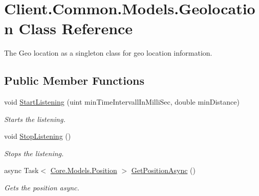 \hypertarget{classClient_1_1Common_1_1Models_1_1Geolocation}{}\section{Client.\+Common.\+Models.\+Geolocation Class Reference}
\label{classClient_1_1Common_1_1Models_1_1Geolocation}


The Geo location as a singleton class for geo location information.  


\subsection*{Public Member Functions}
\begin{DoxyCompactItemize}
\item 
void \hyperlink{classClient_1_1Common_1_1Models_1_1Geolocation_aed14d4e1cc101de935133d0fae3ef349}{Start\+Listening} (uint min\+Time\+Intervall\+In\+Milli\+Sec, double min\+Distance)
\begin{DoxyCompactList}\small\item\em Starts the listening. \end{DoxyCompactList}\item 
void \hyperlink{classClient_1_1Common_1_1Models_1_1Geolocation_a6b6da0803d978de553791129b51954e9}{Stop\+Listening} ()
\begin{DoxyCompactList}\small\item\em Stops the listening. \end{DoxyCompactList}\item 
async Task$<$ \hyperlink{classCore_1_1Models_1_1Position}{Core.\+Models.\+Position} $>$ \hyperlink{classClient_1_1Common_1_1Models_1_1Geolocation_abdc9ec177a896fdc87fa9850a104a79e}{Get\+Position\+Async} ()
\begin{DoxyCompactList}\small\item\em Gets the position async. \end{DoxyCompactList}\end{DoxyCompactItemize}
